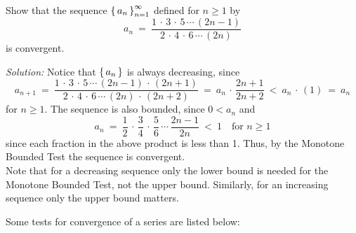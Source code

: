 \begin{exmp}
\noindent Show that the sequence $\left\lbrace\mspace{3mu}a_n\mspace{3mu}\right\rbrace_{n=1}^{\infty}$ defined for $n\ge 1$
by
\[
a_n ~=~ \frac{1 \,\cdot\, 3 \,\cdot\, 5 \,\cdots\, (2n-1)}
{2 \,\cdot\, 4 \,\cdot\, 6 \,\cdots\, (2n)}
\]
is convergent.\vspace{1mm}
\par\noindent\emph{Solution:} Notice that $\left\lbrace\mspace{3mu}a_n\mspace{3mu}\right\rbrace$ is always decreasing,
since
\[
a_{n+1} ~=~ \frac{1 \,\cdot\, 3 \,\cdot\, 5 \,\cdots\, (2n-1) \,\cdot\, (2n+1)}
{2 \,\cdot\, 4 \,\cdot\, 6 \,\cdots\, (2n)\,\cdot\, (2n+2)} ~=~
a_n \,\cdot\, \frac{2n+1}{2n+2} ~<~ a_n \,\cdot\, (1) ~=~ a_n
\]
for $n\ge 1$. The sequence is also bounded, since $0 < a_n$ and
\[
a_n ~=~ \frac{1}{2} \,\cdot\, \frac{3}{4} \,\cdot\, \frac{5}{6} \,\cdots\,
\frac{2n-1}{2n} ~<~ 1 \quad\text{for $n\ge 1$}
\]
since each fraction in the above product is less than 1. Thus, by the Monotone
Bounded Test the sequence is convergent.\\Note that for a decreasing sequence
only the lower bound is needed for the Monotone Bounded Test, not the upper
bound. Similarly, for an increasing sequence only the upper bound matters.
\end{exmp}
\divider
\newpage
\noindent Some tests for convergence of a series are listed below:

